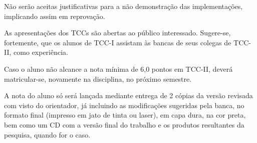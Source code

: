Não serão aceitas justificativas para a não demonstração das implementações, implicando assim em reprovação.

As apresentações dos TCCs são abertas ao público interessado. Sugere-se, fortemente, que os alunos de TCC-I assistam às bancas de seus colegas de TCC-II, como experiência.

Caso o aluno não alcance a nota mínima de 6,0 pontos em TCC-II, deverá matricular-se, novamente na disciplina, no próximo semestre.
	
A nota do aluno só será lançada mediante entrega de 2 cópias da versão revisada com visto do orientador, já incluindo as modificações sugeridas pela banca, no formato final (impresso em jato de tinta ou laser), em capa dura, na cor preta, bem como um CD com a versão final do trabalho e os produtos resultantes da pesquisa, quando for o caso.

	
